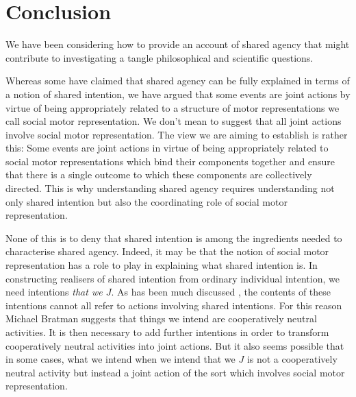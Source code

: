 \documentclass[12pt,\papersize]{extarticle}
\begin{document}
\section{Conclusion}
We have been considering how to provide an account of shared agency that might contribute to investigating a tangle philosophical and scientific questions.

Whereas some have claimed that shared agency can be fully explained in terms of a notion of shared intention, we have argued that some events are joint actions by virtue of being appropriately related to a structure of motor representations we call social motor representation.
We don’t mean to suggest that all joint actions involve social motor representation.
The view we are aiming to establish is rather this: Some events are joint actions in virtue of being appropriately related to social motor representations which bind their components together and ensure that there is a single outcome to which these components are collectively directed.
This is why 
understanding shared agency requires understanding not only shared intention but also
 the coordinating role of social motor representation.

None of this is to deny that shared intention is among the ingredients needed to characterise shared agency.
Indeed, it may be that the notion of social motor representation has a role to play in explaining what shared intention is.
In constructing realisers of shared intention from ordinary individual intention, we need intentions \emph{that we $J$}.
As has been much discussed \citep[e.g.][]{petersson_collectivity_2007}, the contents of these intentions cannot all refer to actions involving shared intentions.
For this reason Michael Bratman suggests that things we intend are  cooperatively neutral activities. %
It is then necessary to add further intentions in order to transform cooperatively neutral activities into joint actions.
But it also seems possible that in some cases, what we intend when we intend that we $J$ is not a cooperatively neutral activity but instead a joint action of the sort which involves social motor representation.
\end{document}
